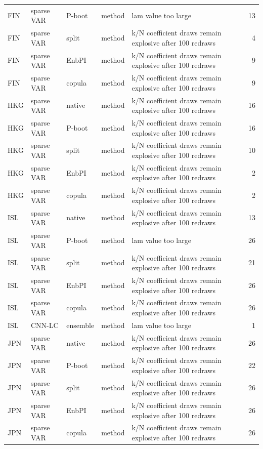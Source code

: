 {\begin{longtable}{@{}lllp{1.6cm}p{6.2cm}r@{}}
FIN & sparse VAR & P-boot & method & lam value too large & 13 \\
FIN & sparse VAR & split & method & k/N coefficient draws remain explosive after 100 redraws & 4 \\
FIN & sparse VAR & EnbPI & method & k/N coefficient draws remain explosive after 100 redraws & 9 \\
FIN & sparse VAR & copula & method & k/N coefficient draws remain explosive after 100 redraws & 9 \\
HKG & sparse VAR & native & method & k/N coefficient draws remain explosive after 100 redraws & 16 \\
HKG & sparse VAR & P-boot & method & k/N coefficient draws remain explosive after 100 redraws & 16 \\
HKG & sparse VAR & split & method & k/N coefficient draws remain explosive after 100 redraws & 10 \\
HKG & sparse VAR & EnbPI & method & k/N coefficient draws remain explosive after 100 redraws & 2 \\
HKG & sparse VAR & copula & method & k/N coefficient draws remain explosive after 100 redraws & 2 \\
ISL & sparse VAR & native & method & k/N coefficient draws remain explosive after 100 redraws & 13 \\
ISL & sparse VAR & P-boot & method & lam value too large & 26 \\
ISL & sparse VAR & split & method & k/N coefficient draws remain explosive after 100 redraws & 21 \\
ISL & sparse VAR & EnbPI & method & k/N coefficient draws remain explosive after 100 redraws & 26 \\
ISL & sparse VAR & copula & method & k/N coefficient draws remain explosive after 100 redraws & 26 \\
ISL & CNN-LC & ensemble & method & lam value too large & 1 \\
JPN & sparse VAR & native & method & k/N coefficient draws remain explosive after 100 redraws & 26 \\
JPN & sparse VAR & P-boot & method & k/N coefficient draws remain explosive after 100 redraws & 22 \\
JPN & sparse VAR & split & method & k/N coefficient draws remain explosive after 100 redraws & 26 \\
JPN & sparse VAR & EnbPI & method & k/N coefficient draws remain explosive after 100 redraws & 26 \\
JPN & sparse VAR & copula & method & k/N coefficient draws remain explosive after 100 redraws & 26 \\

\end{longtable}}
